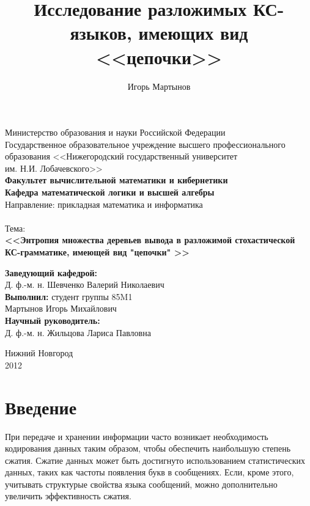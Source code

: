\documentclass[12pt]{article}
\title{Исследование разложимых КС-языков, имеющих вид <<цепочки>>}
\author{Игорь Мартынов}
\begin{document}
\clearpage

\begin{titlepage}
	\begin{center}
		Министерство образования и науки Российской Федерации \\
		Государственное образовательное учреждение высшего профессионального образования <<Нижегородский государственный университет \\
		им. Н.И. Лобачевского>> \\
		\vspace{5mm}
		\textbf{Факультет вычислительной математики и кибернетики} \\
		\textbf{Кафедра математической логики и высшей алгебры} \\
		\vspace{5mm}
		Направление: прикладная математика и информатика \\
		\vspace{25mm}
		{\Large \textbf{} } \\
		\vspace{10mm}
		Тема: \\
		{\large \textbf{<<Энтропия множества деревьев вывода в разложимой стохастической КС-грамматике, имеющей вид "цепочки" {>>}} }
		\vspace{10mm}
	\end{center}
	
	\begin{flushright}
		\textbf{Заведующий кафедрой:}\\
		Д. ф.-м. н. Шевченко Валерий Николаевич\\
		\vspace{10mm}
		\textbf{Выполнил:} студент группы 85M1\\
		Мартынов Игорь Михайлович\\
		\vspace{10mm}
		\textbf{Научный руководитель:} \\
		Д. ф.-м. н. Жильцова Лариса Павловна \\
	\end{flushright}
	
	\vfill
	\begin{center}
		Нижний Новгород\\
		2012
	\end{center}
\end{titlepage}

\tableofcontents
\newpage

\section{Введение}
При передаче и хранении информации часто возникает необходимость кодирования данных таким образом, чтобы обеспечить наибольшую степень сжатия. Сжатие данных может быть достигнуто использованием статистических данных, таких как частоты появления букв в сообщениях. Если, кроме этого, учитывать структурые свойства языка сообщений, можно дополнительно увеличить эффективность сжатия.
\end{document}
